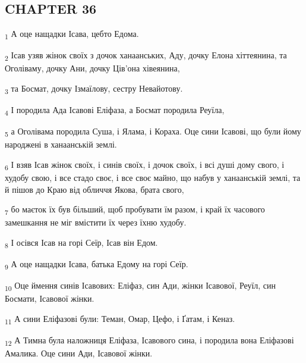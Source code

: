 \subsection{CHAPTER 36}
\begin{tcolorbox}
\textsubscript{1} А оце нащадки Ісава, цебто Едома.
\end{tcolorbox}
\begin{tcolorbox}
\textsubscript{2} Ісав узяв жінок своїх з дочок ханаанських, Аду, дочку Елона хіттеянина, та Оголіваму, дочку Ани, дочку Ців'она хівеянина,
\end{tcolorbox}
\begin{tcolorbox}
\textsubscript{3} та Босмат, дочку Ізмаїлову, сестру Невайотову.
\end{tcolorbox}
\begin{tcolorbox}
\textsubscript{4} І породила Ада Ісавові Еліфаза, а Босмат породила Реуїла,
\end{tcolorbox}
\begin{tcolorbox}
\textsubscript{5} а Оголівама породила Суша, і Ялама, і Кораха. Оце сини Ісавові, що були йому народжені в ханаанській землі.
\end{tcolorbox}
\begin{tcolorbox}
\textsubscript{6} І взяв Ісав жінок своїх, і синів своїх, і дочок своїх, і всі душі дому свого, і худобу свою, і все стадо своє, і все своє майно, що набув у ханаанській землі, та й пішов до Краю від обличчя Якова, брата свого,
\end{tcolorbox}
\begin{tcolorbox}
\textsubscript{7} бо маєток їх був більший, щоб пробувати їм разом, і край їх часового замешкання не міг вмістити їх через їхню худобу.
\end{tcolorbox}
\begin{tcolorbox}
\textsubscript{8} І осівся Ісав на горі Сеїр, Ісав він Едом.
\end{tcolorbox}
\begin{tcolorbox}
\textsubscript{9} А оце нащадки Ісава, батька Едому на горі Сеїр.
\end{tcolorbox}
\begin{tcolorbox}
\textsubscript{10} Оце ймення синів Ісавових: Еліфаз, син Ади, жінки Ісавової, Реуїл, син Босмати, Ісавової жінки.
\end{tcolorbox}
\begin{tcolorbox}
\textsubscript{11} А сини Еліфазові були: Теман, Омар, Цефо, і Ґатам, і Кеназ.
\end{tcolorbox}
\begin{tcolorbox}
\textsubscript{12} А Тимна була наложниця Еліфаза, Ісавового сина, і породила вона Еліфазові Амалика. Оце сини Ади, Ісавової жінки.
\end{tcolorbox}

